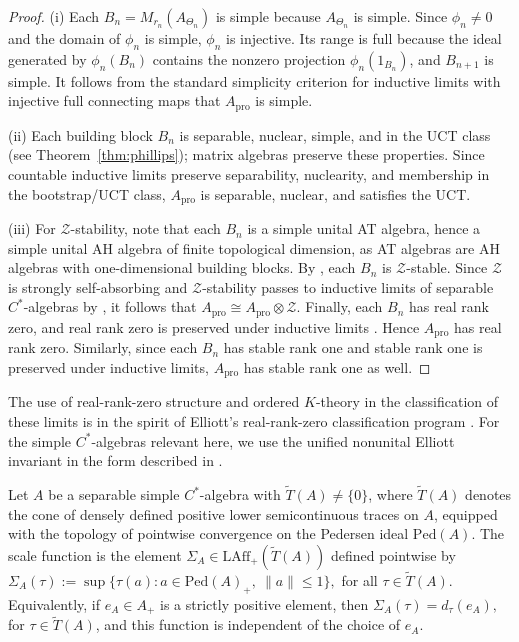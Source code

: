 \documentclass[11pt]{amsart}
\theoremstyle{definition}
\theoremstyle{remark}
\newcommand{\Ped}{\mathrm{Ped}}
\newcommand{\LAff}{\mathrm{LAff}}
\newcommand{\ex}{\mathrm{pro}}
\begin{document}
\begin{proof}

(i) Each $B_n=M_{r_n}(A_{\Theta_n})$ is simple because $A_{\Theta_n}$ is simple. %
Since $\phi_n\neq 0$ and the domain of $\phi_n$ is simple, $\phi_n$ is injective. Its range is full because the ideal generated by $\phi_n(B_n)$ contains the nonzero projection $\phi_n(1_{B_n})$, and $B_{n+1}$ is simple. It follows from the standard simplicity criterion for inductive limits with injective full connecting maps that $A_{\ex}$ is simple.

(ii) Each building block $B_n$ is separable, nuclear, simple, and in the UCT class (see Theorem~\ref{thm:phillips}); matrix algebras
preserve these properties. Since countable inductive limits preserve separability,
nuclearity, and membership in the bootstrap/UCT class, $A_{\ex}$ is separable, nuclear,
and satisfies the UCT.

(iii) For $\mathcal Z$-stability, note that each $B_n$ is a simple unital AT algebra,
hence a simple unital AH algebra of finite topological dimension, as AT algebras
are AH algebras with one-dimensional building blocks. 
By \cite[Corollary~3.1]{TomsWinterZASH}, each $B_n$ is $\mathcal Z$-stable.
Since $\mathcal Z$ is strongly self-absorbing and $\mathcal{Z}$-stability passes to inductive
limits of separable $C^*$-algebras by \cite[Corollary~3.4]{TomsWinterSSA}, it follows that $A_{\ex}\cong A_{\ex}\otimes \mathcal Z.$
Finally, each $B_n$ has real rank zero, and real rank zero is preserved under
inductive limits \cite{BlackadarDadarlatRordamRR}. Hence $A_{\ex}$ has real rank zero. Similarly, since each \(B_n\) has stable rank one and stable rank one is preserved under inductive limits, \(A_{\ex}\) has stable rank one as well.
\end{proof}

The use of real-rank-zero structure and ordered $K$-theory in the
classification of these limits is in the spirit of Elliott's real-rank-zero
classification program \cite{ElliottRR0}. For the simple $C^*$-algebras relevant here, we use the unified nonunital
Elliott invariant in the form described in
\cite[Definition~5.8]{GongLinNiuReview}.

Let $A$ be a separable simple \(C^*\)-algebra with
$\widetilde T(A)\neq\{0\}$, where $\widetilde T(A)$ denotes the cone of
densely defined positive lower semicontinuous traces on $A$, equipped with
the topology of pointwise convergence on the Pedersen ideal $\Ped(A)$.
The scale function is the element $\Sigma_A\in \LAff_+(\widetilde T(A))$
defined pointwise by $\Sigma_A(\tau):=
\sup\{\tau(a):a\in \Ped(A)_+,\ \|a\|\leq 1\},$ for all $\tau\in\widetilde T(A).$ Equivalently, if $e_A\in A_+$ is a strictly positive element, then
$\Sigma_A(\tau)=d_\tau(e_A),$ for $\tau\in\widetilde T(A)$,
and this function is independent of the choice of $e_A$.
\end{document}
